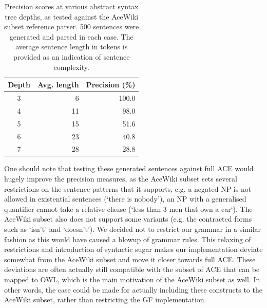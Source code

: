 \documentclass[a4paper]{article}
\begin{document}
\begin{table}
\begin{center}
\begin{tabular}{ c r r }
\hline
Depth & Avg. length & Precision (\%) \\
\hline
3 & 6 & 100.0 \\
4 & 11 & 98.0 \\
5 & 15 & 51.6 \\
6 & 23 & 40.8 \\
7 & 28 & 28.8 \\
\hline
\end{tabular}
\end{center}
\caption{Precision scores at various abstract syntax tree depths, as
  tested against the AceWiki subset reference parser. 500 sentences
  were generated and parsed in each case. The average sentence length
  in tokens is provided as an indication of
  sentence complexity.\protect\label{table:precision_scores}}
\end{table}

One should note that testing these generated sentences against full
ACE would hugely improve the precision measures, as the AceWiki subset
sets several restrictions on the sentence patterns that it supports,
e.g. a negated NP is not allowed in existential sentences (`there is
nobody'), an NP with a generalised quantifier cannot take a relative
clause (`less than 3 men that own a car`). The AceWiki subset also
does not support some variants (e.g. the contracted forms such as
`isn't' and `doesn't').  We decided not to restrict our grammar in a
similar fashion as this would have caused a blowup of grammar
rules. This relaxing of restrictions and introduction of syntactic
sugar makes our implementation deviate somewhat from the AceWiki subset
and move it closer towards full ACE.
These deviations are often actually still compatible with the
subset of ACE that can be mapped to OWL, which is the main motivation
of the AceWiki subset as well. In other words, the case could be 
made for actually including these constructs to the AceWiki subset, rather
than restricting the GF implementation.

\end{document}
